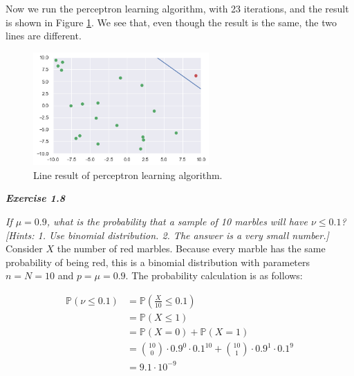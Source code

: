 \documentclass{article}
\newcommand{\prob}{\mathbb{P}}
\begin{document}
    Now we run the perceptron learning algorithm, with 23 iterations, and the result is shown in Figure \ref{fig:pla}.
    We see that, even though the result is the same, the two lines are different.
    
    \begin{figure}[H]
        \centering
        \includegraphics[width=0.6\textwidth]{exercise_1.4_3.png}
        \caption{Line result of perceptron learning algorithm.}
        \label{fig:pla}
    \end{figure}

    \bigskip

    \noindent \textbf{\textit{Exercise 1.8}}

    \noindent \textit{If $\mu = 0.9$, what is the probability that a sample of 10 marbles will have $\nu \le 0.1$? [Hints: 1. Use binomial distribution. 2. The answer is a very small number.]} \\

    Consider $X$ the number of red marbles.
    Because every marble has the same probability of being red, this is a binomial distribution with parameters $n = N = 10$ and $p = \mu = 0.9$.
    The probability calculation is as follows:

    \begin{align*}
        \prob(\nu \le 0.1) &= \prob\left(\frac{X}{10} \le 0.1\right) \\
        &= \prob(X \le 1) \\
        &= \prob(X = 0) + \prob(X = 1) \\
        &= {10 \choose 0} \cdot 0.9^0 \cdot 0.1^{10} + {10 \choose 1} \cdot 0.9^1 \cdot 0.1^9 \\
        &= 9.1 \cdot 10^{-9}
    \end{align*}

    
    
\end{document}
